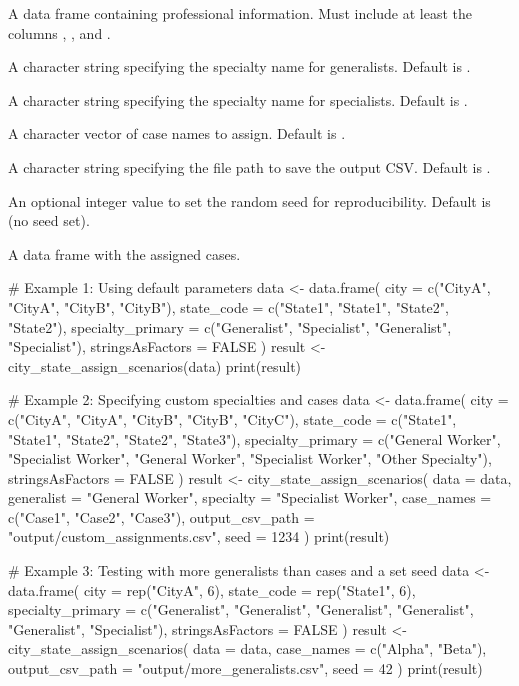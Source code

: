 \documentclass[a4paper]{book}
\begin{document}
\begin{Arguments}
\begin{ldescription}
\item[\code{data}] A data frame containing professional information. Must include at least the columns , , and .

\item[\code{generalist}] A character string specifying the specialty name for generalists. Default is .

\item[\code{specialty}] A character string specifying the specialty name for specialists. Default is .

\item[\code{case\_names}] A character vector of case names to assign. Default is .

\item[\code{output\_csv\_path}] A character string specifying the file path to save the output CSV. Default is .

\item[\code{seed}] An optional integer value to set the random seed for reproducibility. Default is  (no seed set).
\end{ldescription}
\end{Arguments}
%
\begin{Value}
A data frame with the assigned cases.
\end{Value}
%
\begin{Examples}
\begin{ExampleCode}
# Example 1: Using default parameters
data <- data.frame(
  city = c("CityA", "CityA", "CityB", "CityB"),
  state_code = c("State1", "State1", "State2", "State2"),
  specialty_primary = c("Generalist", "Specialist", "Generalist", "Specialist"),
  stringsAsFactors = FALSE
)
result <- city_state_assign_scenarios(data)
print(result)

# Example 2: Specifying custom specialties and cases
data <- data.frame(
  city = c("CityA", "CityA", "CityB", "CityB", "CityC"),
  state_code = c("State1", "State1", "State2", "State2", "State3"),
  specialty_primary = c("General Worker", "Specialist Worker", "General Worker", "Specialist Worker", "Other Specialty"),
  stringsAsFactors = FALSE
)
result <- city_state_assign_scenarios(
  data = data,
  generalist = "General Worker",
  specialty = "Specialist Worker",
  case_names = c("Case1", "Case2", "Case3"),
  output_csv_path = "output/custom_assignments.csv",
  seed = 1234
)
print(result)

# Example 3: Testing with more generalists than cases and a set seed
data <- data.frame(
  city = rep("CityA", 6),
  state_code = rep("State1", 6),
  specialty_primary = c("Generalist", "Generalist", "Generalist", "Generalist", "Generalist", "Specialist"),
  stringsAsFactors = FALSE
)
result <- city_state_assign_scenarios(
  data = data,
  case_names = c("Alpha", "Beta"),
  output_csv_path = "output/more_generalists.csv",
  seed = 42
)
print(result)

\end{ExampleCode}
\end{Examples}
\end{document}
